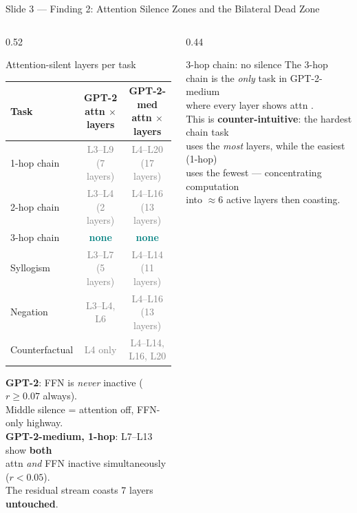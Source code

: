 \documentclass[aspectratio=169,10pt]{beamer}
\newcommand{\cmark}{\ding{51}}
\newcommand{\yes}[1]{\textcolor{teal}{\textbf{#1}}}
\newcommand{\no}[1] {\textcolor{gray}{#1}}
\begin{document}
\begin{frame}{Slide 3 — Finding 2: Attention Silence Zones and the Bilateral Dead Zone}

\begin{columns}[T]

\begin{column}{0.52\textwidth}
\begin{block}{Attention-silent layers per task}
\footnotesize
\setlength{\tabcolsep}{4pt}
\begin{tabular}{lcc}
\toprule
Task & GPT-2 attn $\times$ layers & GPT-2-med attn $\times$ layers \\
\midrule
1-hop chain  & \no{L3–L9 (7 layers)} & \no{L4–L20 (17 layers)} \\
2-hop chain  & \no{L3–L4 (2 layers)} & \no{L4–L16 (13 layers)} \\
3-hop chain  & \yes{none}            & \yes{none} \\
Syllogism    & \no{L3–L7 (5 layers)} & \no{L4–L14 (11 layers)} \\
Negation     & \no{L3–L4, L6}        & \no{L4–L16 (13 layers)} \\
Counterfactual & \no{L4 only}        & \no{L4–L14, L16, L20} \\
\bottomrule
\end{tabular}

\medskip
\textbf{GPT-2}: FFN is \emph{never} inactive ($r \geq 0.07$ always).\\
Middle silence = attention off, FFN-only highway.\\[4pt]
\textbf{GPT-2-medium, 1-hop}: L7–L13 show \textbf{both}\\
attn \emph{and} FFN inactive simultaneously ($r < 0.05$).\\
The residual stream coasts 7 layers \textbf{untouched}.
\end{block}
\end{column}

\begin{column}{0.44\textwidth}
\begin{block}{3-hop chain: no silence}
\footnotesize
The 3-hop chain is the \emph{only} task in GPT-2-medium\\
where every layer shows attn \yes{\cmark{}}.\\[6pt]
This is \textbf{counter-intuitive}: the hardest chain task\\
uses the \emph{most} layers, while the easiest (1-hop)\\
uses the fewest — concentrating computation\\
into $\approx$6 active layers then coasting.
\end{block}


\end{column}
\end{columns}
\end{frame}
\end{document}
